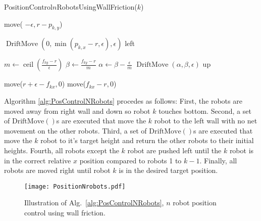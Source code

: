 \begin{algorithm}
\caption{PositionControl$n$RobotsUsingWallFriction($k$)}\label{alg:PosControlNRobots}
\begin{algorithmic}[1]
\State move( $-\epsilon, r-p_{k,y}$) %


\State $\operatorname{DriftMove}(0, \min(p_{k,x} - r,\epsilon), \epsilon)$ left   %
\EndWhile

\State $m \gets \operatorname{ceil}(\frac{f_{ky}-r}{\epsilon})$
\State $\beta \gets \frac{f_{ky}-r}{m}$
\State $\alpha \gets \beta - \frac{\epsilon}{m}$
\State $\operatorname{DriftMove}(\alpha, \beta, \epsilon)$ up   %
\EndFor

\State move($r+\epsilon-f_{kx}, 0$)  %
\State move($f_{kx}-r, 0$)  

\end{algorithmic}
\end{algorithm}
Algorithm \ref{alg:PosControlNRobots} procedes as follows:  
First, the robots are moved  away from right wall and down so robot $k$ touches bottom.
Second, a set of $\operatorname{DriftMove()}$s are executed that  move the $k$ robot to the left wall with no net movement on the other robots.
Third, a set of $\operatorname{DriftMove()}$s are executed that  move the $k$ robot to it's target height and return the other robots to their initial heights. 
Fourth, all robots except the $k$ robot are pushed left until the $k$ robot is in the correct relative $x$ position compared to robots 1 to $k-1$.
Finally, all robots are moved right until robot $k$ is in the desired target position.
\begin{figure}
\begin{center}
	\texttt{[image: PositionNrobots.pdf]}
\end{center}
\caption{\label{fig:construction2d}
Illustration of Alg.\ \ref{alg:PosControlNRobots}, $n$ robot position control  using wall friction.
}
\end{figure}













